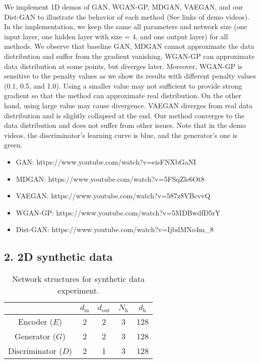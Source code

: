 \documentclass[runningheads]{llncs}
\begin{document}
We implement 1D demos of GAN, WGAN-GP, MDGAN, VAEGAN, and our Dist-GAN to illustrate the behavior of each method (See links of demo videos). In the implementation, we keep the same all parameters and network size (one input layer, one hidden layer with size = 4, and one output layer) for all methods. We observe that baseline GAN, MDGAN cannot approximate the data distribution and suffer from the gradient vanishing. WGAN-GP can approximate data distribution at some points, but diverges later. Moreover, WGAN-GP is sensitive to the penalty values as we show its results with different penalty values (0.1, 0.5, and 1.0). Using a  smaller value may not sufficient to provide strong gradient so that the method can approximate real distribution. On the other hand, using large value may cause divergence. VAEGAN diverges from real data distribution and is slightly collapsed at the end. Our method converges to the data distribution and does not suffer from other issues. Note that in the demo videos, the discriminator's learning curve is blue, and the generator's one is green.

\begin{itemize}
\item GAN: https://www.youtube.com/watch?v=eisFNXbGaNI
\item MDGAN: https://www.youtube.com/watch?v=5FSqZle6Ot8
\item VAEGAN: https://www.youtube.com/watch?v=587z8VBcvvQ
\item WGAN-GP: https://www.youtube.com/watch?v=5MDBwdfD5rY
\item Dist-GAN: https://www.youtube.com/watch?v=IjbdMNo4m\_8
\end{itemize}



\subsection*{2. 2D synthetic data}

\begin{table}
\centering
\caption{Network structures for synthetic data experiment.}
\begin{tabular}{c | c c c c}
           & $d_\mathrm{in}$ & $d_\mathrm{out}$ & $N_\mathrm{h}$ & $d_\mathrm{h}$ \\ 
\hline
\hline
Encoder ($E$)            & 2     & 2      & 3        & 128 \\
\hline
Generator ($G$)        & 2     & 2      & 3        & 128 \\
\hline
Discriminator ($D$)  & 2     & 1      & 3        & 128 \\
\end{tabular}
\label{toy_network}
\end{table}
\end{document}

